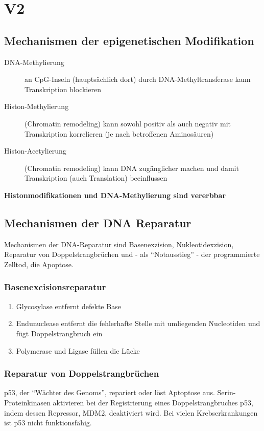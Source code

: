 \section{V2}
\subsection{Mechanismen der epigenetischen Modifikation}
\begin{description}
    \item[DNA-Methylierung] an CpG-Inseln (hauptsächlich dort) durch DNA-Methyltransferase kann Transkription blockieren
    \item[Histon-Methylierung] (Chromatin remodeling) kann sowohl positiv als auch negativ mit Transkription korrelieren (je nach betroffenen Aminosäuren)
    \item[Histon-Acetylierung] (Chromatin remodeling) kann DNA zugänglicher machen und damit Transkription (auch Translation) beeinflussen
\end{description}
\textbf{Histonmodifikationen und DNA-Methylierung sind vererbbar}

\subsection{Mechanismen der DNA Reparatur}
Mechanismen der DNA-Reparatur sind Basenexzision, Nukleotidexzision, Reparatur von Doppelstrangbrüchen und - als ``Notausstieg'' - der programmierte Zelltod, die Apoptose.

\subsubsection{Basenexcisionsreparatur}
\begin{enumerate}
    \item Glycosylase entfernt defekte Base
    \item Endunuclease entfernt die fehlerhafte Stelle mit umliegenden Nucleotiden und fügt Doppelstrangbruch ein
    \item Polymerase und Ligase füllen die Lücke
\end{enumerate}

\subsubsection{Reparatur von Doppelstrangbrüchen}
p53, der ``Wächter des Genoms'', repariert oder löst Aptoptose aus. Serin-Proteinkinasen aktivieren bei der Registrierung eines Doppelstrangbruches p53, indem dessen Repressor, MDM2, deaktiviert wird. Bei vielen Krebserkrankungen ist p53 nicht funktionsfähig.

